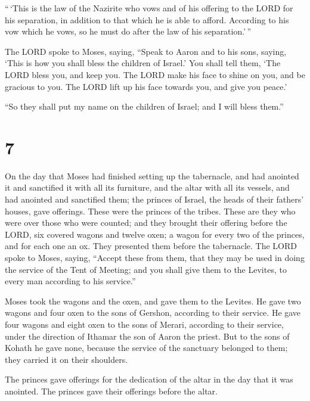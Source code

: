  ``\,`This is the law of the Nazirite who vows and of his
offering to the LORD for his separation, in addition to that which he is
able to afford. According to his vow which he vows, so he must do after
the law of his separation.'\,''

 The LORD spoke to Moses, saying,  ``Speak
to Aaron and to his sons, saying, `This is how you shall bless the
children of Israel.' You shall tell them,  `The LORD
bless you, and keep you.  The LORD make his face to shine
on you, and be gracious to you.  The LORD lift up his
face towards you, and give you peace.'

 ``So they shall put my name on the children of Israel;
and I will bless them.''

\hypertarget{section-6}{%
\section{7}\label{section-6}}

 On the day that Moses had finished setting up the
tabernacle, and had anointed it and sanctified it with all its
furniture, and the altar with all its vessels, and had anointed and
sanctified them;  the princes of Israel, the heads of
their fathers' houses, gave offerings. These were the princes of the
tribes. These are they who were over those who were counted;
 and they brought their offering before the LORD, six
covered wagons and twelve oxen; a wagon for every two of the princes,
and for each one an ox. They presented them before the tabernacle.
 The LORD spoke to Moses, saying,  ``Accept
these from them, that they may be used in doing the service of the Tent
of Meeting; and you shall give them to the Levites, to every man
according to his service.''

 Moses took the wagons and the oxen, and gave them to the
Levites.  He gave two wagons and four oxen to the sons of
Gershon, according to their service.  He gave four wagons
and eight oxen to the sons of Merari, according to their service, under
the direction of Ithamar the son of Aaron the priest.  But
to the sons of Kohath he gave none, because the service of the sanctuary
belonged to them; they carried it on their shoulders.

 The princes gave offerings for the dedication of the
altar in the day that it was anointed. The princes gave their offerings
before the altar.

